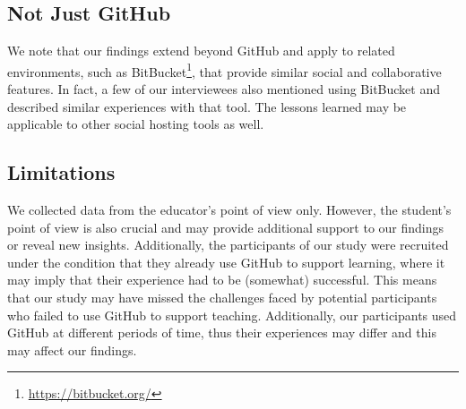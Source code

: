\subsection{Not Just GitHub}
We note that our findings extend beyond GitHub and apply to related environments, such as BitBucket\footnote{\url{https://bitbucket.org/}}, that provide similar social and collaborative features. In fact, a few of our interviewees also mentioned using BitBucket and described similar experiences with that tool. The lessons learned may be applicable to other social hosting tools as well.



\subsection{Limitations}
\label{sec:limitations}
We collected data from the educator's point of view only. However, the student's point of view is also crucial and may provide additional support to our findings or reveal new insights. Additionally, the participants of our study were recruited under the condition that they already use GitHub to support learning, where it may imply that their experience had to be (somewhat) successful. This means that our study may have missed the challenges faced by potential participants who failed to use GitHub to support teaching. Additionally, our participants used GitHub at different periods of time, thus their experiences may differ and this may affect our findings.

